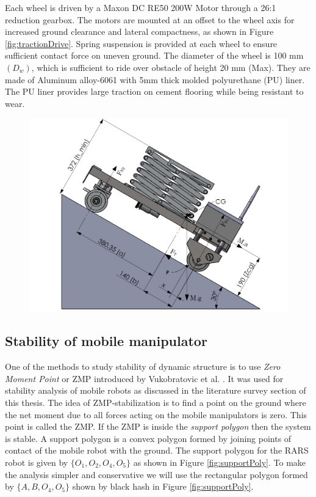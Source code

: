     Each wheel is driven by a  Maxon DC RE50 200W Motor through a 26:1 reduction gearbox. The motors are mounted at an offset to the wheel axis for increased ground clearance and lateral compactness, as shown in Figure \ref{fig:tractionDrive}. Spring suspension is provided at each wheel to ensure sufficient contact force on uneven  ground. The diameter of the wheel is 100 mm $(D_w)$, which is sufficient to ride over obstacle of height 20 mm (Max). They are made of Aluminum alloy-6061 with 5mm thick molded polyurethane (PU) liner. The PU liner provides large traction on cement flooring while being resistant to wear.
    
   \begin{figure}[h]
   	\centering
   	\includegraphics[width=0.85\linewidth,keepaspectratio]{Chapter3/fig/loadDist}
   	\label{fig:loadDistribution}
   \end{figure}
\subsection{Stability of mobile manipulator}
One of the methods to study stability of dynamic structure is to use \textit{Zero Moment Point} or ZMP introduced by Vukobratovic et al. \cite{vukobratovic1969contribution,vukobratovic2012biped}. It was used for stability analysis of mobile robots as discussed in the literature survey section of this thesis.
The idea of ZMP-stabilization  is to find a point on the ground where the net  moment due to all forces acting on the mobile manipulators is zero. This point is called the ZMP. If the ZMP is inside the \textit{support polygon} then the system is stable. A support polygon is a convex polygon formed by joining points of contact of the mobile robot with the ground. The support polygon for the RARS robot is given by $\{O_1,O_2,O_4,O_5\}$ as shown in Figure \ref{fig:supportPoly}. To make the analysis simpler and conservative we will use the rectangular polygon formed by $\{A, B,O_4,O_5\}$ shown by black hash in Figure \ref{fig:supportPoly}. 


